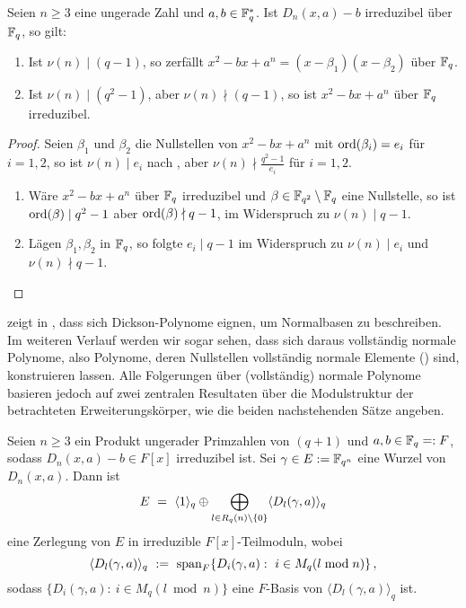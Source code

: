 \begin{kor}
  \label{kor:dickson_quadr}
  Seien $n\geq 3$ eine ungerade Zahl und $a,b \in \mathbb{F}_q^\ast$. Ist $D_n(x,a)-b$
  irreduzibel über $\mathbb{F}_q$, so gilt:
  \begin{enumerate}
    \item Ist $\nu(n) \mid (q-1)$, so zerfällt
      $x^2-bx+a^n = (x-\beta_1)(x-\beta_2)$ über $\mathbb{F}_q$.
    \item Ist $\nu(n) \mid (q^2-1)$, aber $\nu(n)\nmid (q-1)$, so ist
      $x^2-bx+a^n$ über $\mathbb{F}_q$ irreduzibel.
  \end{enumerate}
\end{kor}
\begin{proof}
  Seien $\beta_1$ und $\beta_2$ die Nullstellen von $x^2-bx+a^n$ mit 
  $\operatorname{ord}(\beta_i) = e_i$ für $i=1,2$, so ist $\nu(n) \mid e_i$ nach 
  , aber $\nu(n)\nmid \frac{q^2-1}{e_i}$ für $i=1,2$.
  \begin{enumerate}
    \item Wäre $x^2-bx+a^n$ über $\mathbb{F}_q$ irreduzibel und
      $\beta \in \mathbb{F}_{q^2}\setminus\mathbb{F}_q$ eine Nullstelle, so
      ist $\operatorname{ord}(\beta) \mid q^2-1$ aber $\operatorname{ord}(\beta) \nmid q-1$,
      im Widerspruch zu $\nu(n)\mid q-1$.
    \item Lägen $\beta_1,\beta_2$ in $\mathbb{F}_q$, so folgte $e_i \mid q-1$ im
      Widerspruch zu $\nu(n)\mid e_i$ und $\nu(n)\nmid q-1$.
  \end{enumerate}
\end{proof}


\citeauthor{scheerhorn:1996} zeigt in
\autocites{scheerhorn:1996}{scheerhorn:1997}, dass sich Dickson-Polynome
eignen, um Normalbasen zu beschreiben. Im weiteren Verlauf werden wir sogar
sehen, dass sich daraus vollständig normale Polynome, also Polynome, deren
Nullstellen vollständig normale Elemente () sind,
konstruieren lassen. Alle Folgerungen über (vollständig) normale Polynome
basieren jedoch auf zwei zentralen Resultaten über die Modulstruktur der
betrachteten Erweiterungskörper, wie die beiden nachstehenden Sätze angeben.

\begin{satz}
  \label{satz:scheerhorn1}
  Seien $n\geq 3$ ein Produkt ungerader Primzahlen von $(q+1)$ und 
  $a,b\in \mathbb{F}_q =: F$, sodass $D_n(x,a)-b \in F[x]$ irreduzibel ist.
  Sei $\gamma \in E := \mathbb{F}_{q^n}$ eine Wurzel von $D_n(x,a)$. Dann ist
  \[ E \ =\  \langle 1\rangle_q \oplus 
    \bigoplus_{l\in R_q(n)\setminus \{0\}} \langle D_l(\gamma,a)\rangle_q\]
  eine Zerlegung von $E$ in irreduzible $F[x]$-Teilmoduln, wobei
  \[ \langle D_l(\gamma,a)\rangle_q \ :=\ 
    \operatorname{span}_F\{ D_i(\gamma,a):\ i\in M_q(l\bmod n)\} \,,\]
  sodass $\{ D_i(\gamma,a):\ i\in M_q(l\bmod n)\}$ eine $F$-Basis von
  $\langle D_l(\gamma,a)\rangle_q$ ist.
\end{satz}

